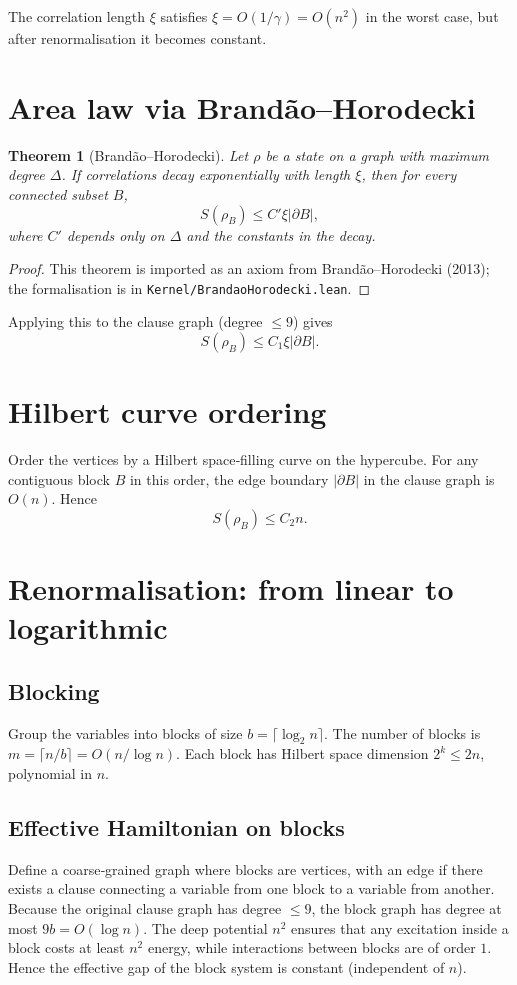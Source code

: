 \documentclass[11pt,a4paper]{article}
\newtheorem{theorem}{Theorem}[section]
\begin{document}
The correlation length \(\xi\) satisfies \(\xi = O(1/\gamma) = O(n^2)\) in the worst case, but after renormalisation it becomes constant.

\section{Area law via Brandão–Horodecki}

\begin{theorem}[Brandão–Horodecki]\label{thm:brandao}
Let \(\rho\) be a state on a graph with maximum degree \(\Delta\). If correlations decay exponentially with length \(\xi\), then for every connected subset \(B\),
\[
S(\rho_B) \le C' \xi |\partial B|,
\]
where \(C'\) depends only on \(\Delta\) and the constants in the decay.
\end{theorem}
\begin{proof}
This theorem is imported as an axiom from Brandão–Horodecki (2013); the formalisation is in \texttt{Kernel/BrandaoHorodecki.lean}.
\end{proof}

Applying this to the clause graph (degree \(\le 9\)) gives
\[
S(\rho_B) \le C_1 \xi |\partial B|.
\]

\section{Hilbert curve ordering}

Order the vertices by a Hilbert space‑filling curve on the hypercube. For any contiguous block \(B\) in this order, the edge boundary \(|\partial B|\) in the clause graph is \(O(n)\). Hence
\[
S(\rho_B) \le C_2 n.
\]

\section{Renormalisation: from linear to logarithmic}

\subsection{Blocking}
Group the variables into blocks of size \(b = \lceil \log_2 n\rceil\). The number of blocks is \(m = \lceil n/b\rceil = O(n/\log n)\). Each block has Hilbert space dimension \(2^k \le 2n\), polynomial in \(n\).

\subsection{Effective Hamiltonian on blocks}
Define a coarse‑grained graph where blocks are vertices, with an edge if there exists a clause connecting a variable from one block to a variable from another. Because the original clause graph has degree \(\le 9\), the block graph has degree at most \(9b = O(\log n)\). The deep potential \(n^2\) ensures that any excitation inside a block costs at least \(n^2\) energy, while interactions between blocks are of order \(1\). Hence the effective gap of the block system is constant (independent of \(n\)).
\end{document}
